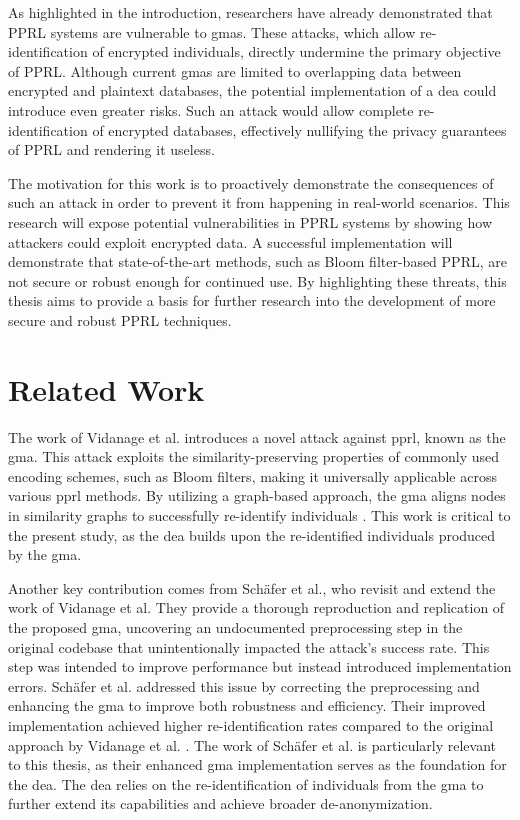 As highlighted in the introduction, researchers have already demonstrated that PPRL systems are vulnerable to \ac{gma}s.
These attacks, which allow re-identification of encrypted individuals, directly undermine the primary objective of PPRL.
Although current \ac{gma}s are limited to overlapping data between encrypted and plaintext databases, the potential implementation of a \ac{dea} could introduce even greater risks.
Such an attack would allow complete re-identification of encrypted databases, effectively nullifying the privacy guarantees of PPRL and rendering it useless.

The motivation for this work is to proactively demonstrate the consequences of such an attack in order to prevent it from happening in real-world scenarios.
This research will expose potential vulnerabilities in PPRL systems by showing how attackers could exploit encrypted data.
A successful implementation will demonstrate that state-of-the-art methods, such as Bloom filter-based PPRL, are not secure or robust enough for continued use.
By highlighting these threats, this thesis aims to provide a basis for further research into the development of more secure and robust PPRL techniques.


\section{Related Work}  \label{sec:rel-work}

The work of Vidanage et al. introduces a novel attack against \ac{pprl}, known as the \ac{gma}.
This attack exploits the similarity-preserving properties of commonly used encoding schemes, such as Bloom filters, making it universally applicable across various \ac{pprl} methods.
By utilizing a graph-based approach, the \ac{gma} aligns nodes in similarity graphs to successfully re-identify individuals \cite{pathak2024}.
This work is critical to the present study, as the \ac{dea} builds upon the re-identified individuals produced by the \ac{gma}.

Another key contribution comes from Schäfer et al., who revisit and extend the work of Vidanage et al.
They provide a thorough reproduction and replication of the proposed \ac{gma}, uncovering an undocumented preprocessing step in the original codebase that unintentionally impacted the attack's success rate.
This step was intended to improve performance but instead introduced implementation errors.
Schäfer et al. addressed this issue by correcting the preprocessing and enhancing the \ac{gma} to improve both robustness and efficiency.
Their improved implementation achieved higher re-identification rates compared to the original approach by Vidanage et al. \cite{schaefer2024}.
The work of Schäfer et al. is particularly relevant to this thesis, as their enhanced \ac{gma} implementation serves as the foundation for the \ac{dea}.
The \ac{dea} relies on the re-identification of individuals from the \ac{gma} to further extend its capabilities and achieve broader de-anonymization.


